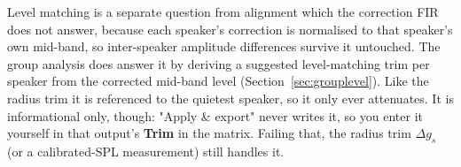 Level matching is a separate question from alignment which the correction FIR does not answer, because each speaker's correction is normalised to that speaker's own mid-band, so inter-speaker amplitude differences survive it untouched. The group analysis does answer it by deriving a suggested level-matching trim per speaker from the corrected mid-band level (Section~\ref{sec:grouplevel}). Like the radius trim it is referenced to the quietest speaker, so it only ever attenuates. It is informational only, though: "Apply \& export" never writes it, so you enter it yourself in that output's \textbf{Trim} in the matrix. Failing that, the radius trim $\Delta g_s$ (or a calibrated-SPL measurement) still handles it.

